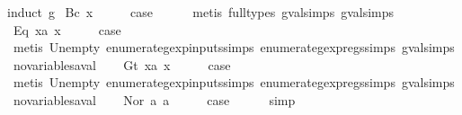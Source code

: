 \begin{isabellebody}
%
\isadelimproof
%
\endisadelimproof
%
\isatagproof
{}\isamarkupfalse%
{\isacharparenleft}induct\ g{\isacharparenright}\isanewline
{}\isamarkupfalse%
\ {\isacharparenleft}Bc\ x{\isacharparenright}\isanewline
\ \ \isamarkupfalse%
\ \isamarkupfalse%
\ {\isacharquery}case\isanewline
\ \ \ \ \isamarkupfalse%
\ {\isacharparenleft}metis\ {\isacharparenleft}full{\isacharunderscore}types{\isacharparenright}\ gval{\isachardot}simps{\isacharparenleft}{}{\isacharparenright}\ gval{\isachardot}simps{\isacharparenleft}{}{\isacharparenright}{\isacharparenright}\isanewline
{}\isamarkupfalse%
\isanewline
\ \ \isamarkupfalse%
\ {\isacharparenleft}Eq\ x{}a\ x{}{\isacharparenright}\isanewline
\ \ \isamarkupfalse%
\ \isamarkupfalse%
\ {\isacharquery}case\isanewline
\ \ \ \ \isamarkupfalse%
\ {\isacharparenleft}metis\ Un{\isacharunderscore}empty\ enumerate{\isacharunderscore}gexp{\isacharunderscore}inputs{\isachardot}simps{\isacharparenleft}{}{\isacharparenright}\ enumerate{\isacharunderscore}gexp{\isacharunderscore}regs{\isachardot}simps{\isacharparenleft}{}{\isacharparenright}\ gval{\isachardot}simps{\isacharparenleft}{}{\isacharparenright}\ no{\isacharunderscore}variables{\isacharunderscore}aval{\isacharparenright}\isanewline
{}\isamarkupfalse%
\isanewline
\ \ \isamarkupfalse%
\ {\isacharparenleft}Gt\ x{}a\ x{}{\isacharparenright}\isanewline
\ \ \isamarkupfalse%
\ \isamarkupfalse%
\ {\isacharquery}case\isanewline
\ \ \ \ \isamarkupfalse%
\ {\isacharparenleft}metis\ Un{\isacharunderscore}empty\ enumerate{\isacharunderscore}gexp{\isacharunderscore}inputs{\isachardot}simps{\isacharparenleft}{}{\isacharparenright}\ enumerate{\isacharunderscore}gexp{\isacharunderscore}regs{\isachardot}simps{\isacharparenleft}{}{\isacharparenright}\ gval{\isachardot}simps{\isacharparenleft}{}{\isacharparenright}\ no{\isacharunderscore}variables{\isacharunderscore}aval{\isacharparenright}\isanewline
{}\isamarkupfalse%
\isanewline
\ \ \isamarkupfalse%
\ {\isacharparenleft}Nor\ a{}\ a{}{\isacharparenright}\isanewline
\ \ \isamarkupfalse%
\ \isamarkupfalse%
\ {\isacharquery}case\isanewline
\ \ \ \ \isamarkupfalse%
\ simp\isanewline

\end{isabellebody}
